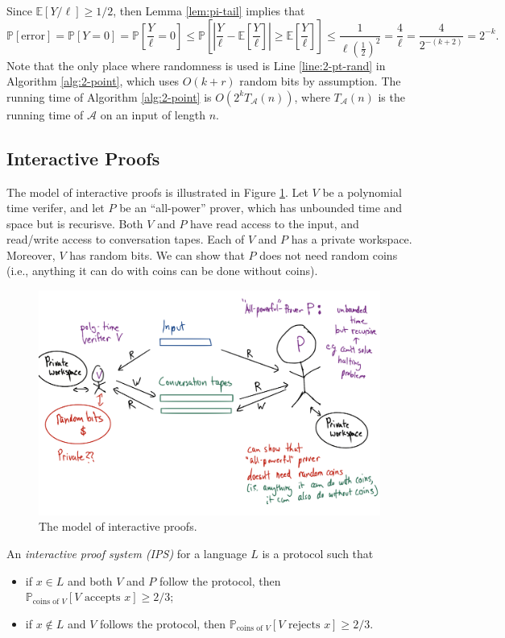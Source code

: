 \documentclass[letterpaper, reqno,11pt]{article}
\newcommand{\PP}{\mathbb{P}}
\newcommand{\EE}{\mathbb{E}}
\begin{document}
Since $\EE[Y/\ell] \geq 1/2$, then Lemma \ref{lem:pi-tail} implies that
$$ \PP[\text{error}] = \PP[Y = 0] = \PP\left[\frac{Y}{\ell} = 0\right] \leq \PP\left[\left| \frac{Y}{\ell} - \EE\left[\frac{Y}{\ell}\right] \right| \geq \EE\left[\frac{Y}{\ell}\right]\right] \leq \frac{1}{\ell \left(\frac{1}{2}\right)^2} = \frac{4}{\ell} = \frac{4}{2^{-(k + 2)}} = 2^{-k}. $$
Note that the only place where randomness is used is Line \ref{line:2-pt-rand} in Algorithm \ref{alg:2-point}, which uses $O(k + r)$ random bits by assumption. The running time of Algorithm \ref{alg:2-point} is $O(2^k T_{\mathcal A}(n))$, where $T_{\mathcal A}(n)$ is the running time of $\mathcal A$ on an input of length $n$.

\subsection{Interactive Proofs}

The model of interactive proofs is illustrated in Figure \ref{fig:ip}. Let $V$ be a polynomial time verifer, and let $P$ be an ``all-power'' prover, which has unbounded time and space but is recurisve. Both $V$ and $P$ have read access to the input, and read/write access to conversation tapes. Each of $V$ and $P$ has a private workspace. Moreover, $V$ has random bits. We can show that $P$ does not need random coins (i.e., anything it can do with coins can be done without coins).

\begin{figure}[h]
  \centering
  \includegraphics[width=\textwidth]{figures/ip.png}
  \caption{The model of interactive proofs.}
  \label{fig:ip}
\end{figure}

\begin{definition}
  An \emph{interactive proof system (IPS)} for a language $L$ is a protocol such that
  \begin{itemize}[itemsep=0pt]
    \item if $x \in L$ and both $V$ and $P$ follow the protocol, then $\PP_\text{coins of $V$}[\text{$V$ accepts $x$}] \geq 2/3$;
    \item if $x \not \in L$ and $V$ follows the protocol, then $\PP_\text{coins of $V$}[\text{$V$ rejects $x$}] \geq 2/3$.
  \end{itemize}
\end{definition}
\end{document}
